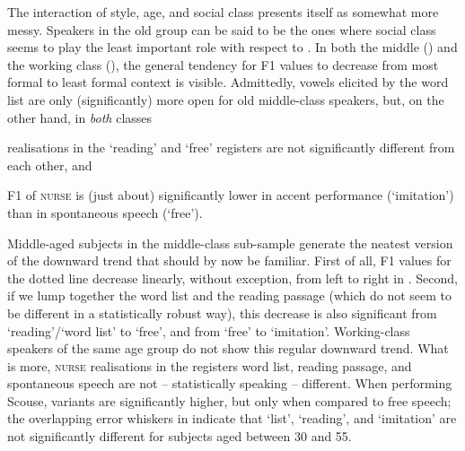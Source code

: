 The interaction of style, age, and social class presents itself as somewhat more messy.
Speakers in the old group can be said to be the ones where social class seems to play the least important role with respect to .
In both the middle () and the working class (), the general tendency for F1 values to decrease from most formal to least formal context is visible.
Admittedly, vowels elicited by the word list are only (significantly) more open for old middle-class speakers, but, on the other hand, in \emph{both} classes
\begin{inparaenum}[(a)]
	\item realisations in the `reading' and `free' registers are not significantly different from each other, and
	\item F1 of \textsc{nurse} is (just about) significantly lower in accent performance (`imitation') than in spontaneous speech (`free').
\end{inparaenum}

Middle-aged subjects in the middle-class sub-sample generate the neatest version of the downward trend that should by now be familiar.
First of all, F1 values for the dotted line decrease linearly, without exception, from left to right in .
Second, if we lump together the word list and the reading passage (which do not seem to be different in a statistically robust way), this decrease is also significant from `reading'/`word list' to `free', and from `free' to `imitation'.
Working-class speakers of the same age group do not show this regular downward trend.
What is more, \textsc{nurse} realisations in the registers word list, reading passage, and spontaneous speech are not -- statistically speaking -- different.
When performing Scouse, variants are significantly higher, but only when compared to free speech; the overlapping error whiskers in  indicate that `list', `reading', and `imitation' are not significantly different for subjects aged between 30 and 55.

